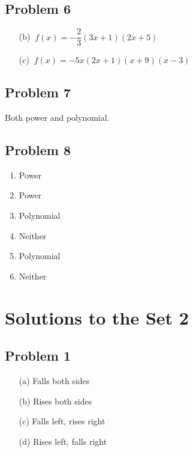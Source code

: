 \documentclass[12pt]{article}
\begin{document}
\subsection*{Problem 6}
\begin{enumerate}
    \item[(b)] $\ f(x) = -\dfrac{2}{3}(3x + 1)(2x + 5)$
    \item[(c)] $\ f(x) = -5x(2x + 1)(x + 9)(x - 3)$ 
\end{enumerate}
\subsection*{Problem 7}
Both power and polynomial.
\subsection*{Problem 8}
    \begin{enumerate}[label=(\alph*)]
    \item Power
    \item Power
    \item Polynomial
    \item Neither
    \item Polynomial
    \item Neither
    \end{enumerate}
\section*{Solutions to the Set 2}
\subsection*{Problem 1}

    \begin{enumerate}
        \item[(a)] Falls both sides
        \item[(b)] Rises both sides
        \item[(c)] Falls left, rises right
        \item[(d)] Rises left, falls right
    \end{enumerate}
\end{document}
